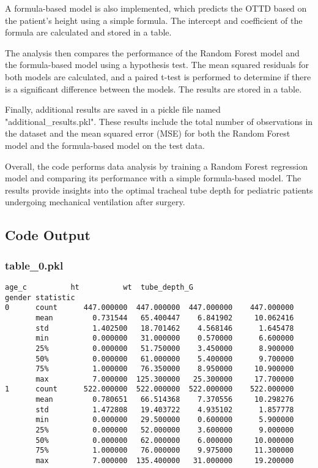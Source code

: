 \documentclass[11pt]{article}
\begin{document}
A formula-based model is also implemented, which predicts the OTTD based on the patient's height using a simple formula. The intercept and coefficient of the formula are calculated and stored in a table.

The analysis then compares the performance of the Random Forest model and the formula-based model using a hypothesis test. The mean squared residuals for both models are calculated, and a paired t-test is performed to determine if there is a significant difference between the models. The results are stored in a table.

Finally, additional results are saved in a pickle file named "additional\_results.pkl". These results include the total number of observations in the dataset and the mean squared error (MSE) for both the Random Forest model and the formula-based model on the test data.

Overall, the code performs data analysis by training a Random Forest regression model and comparing its performance with a simple formula-based model. The results provide insights into the optimal tracheal tube depth for pediatric patients undergoing mechanical ventilation after surgery.

\subsection{Code Output}

\subsubsection*{table\_0.pkl}

\begin{Verbatim}[tabsize=4]
                       age_c          ht          wt  tube_depth_G
gender statistic
0      count      447.000000  447.000000  447.000000    447.000000
       mean         0.731544   65.400447    6.841902     10.062416
       std          1.402500   18.701462    4.568146      1.645478
       min          0.000000   31.000000    0.570000      6.600000
       25%          0.000000   51.750000    3.450000      8.900000
       50%          0.000000   61.000000    5.400000      9.700000
       75%          1.000000   76.350000    8.950000     10.900000
       max          7.000000  125.300000   25.300000     17.700000
1      count      522.000000  522.000000  522.000000    522.000000
       mean         0.780651   66.514368    7.370556     10.298276
       std          1.472808   19.403722    4.935102      1.857778
       min          0.000000   29.500000    0.600000      5.900000
       25%          0.000000   52.000000    3.600000      9.000000
       50%          0.000000   62.000000    6.000000     10.000000
       75%          1.000000   76.000000    9.975000     11.300000
       max          7.000000  135.400000   31.000000     19.200000
\end{Verbatim}
\end{document}
